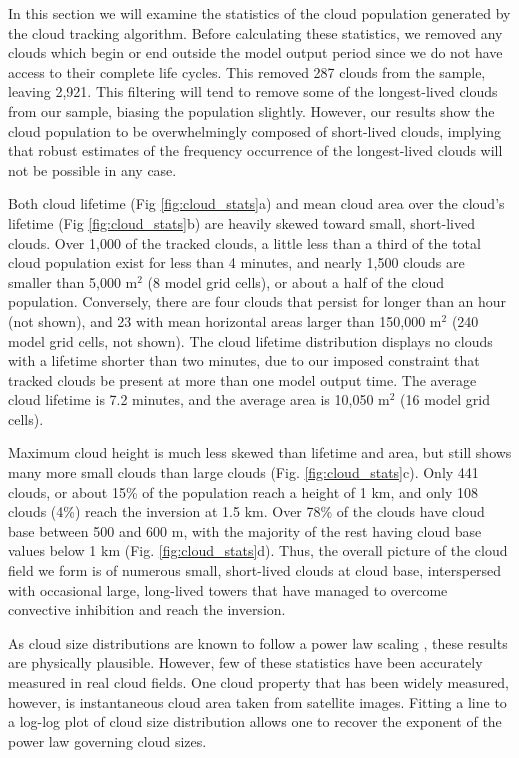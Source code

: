 \documentclass[acp]{copernicus}
\begin{document}
In this section we will examine the statistics of the cloud population 
generated by the cloud tracking algorithm.  Before calculating these 
statistics, we removed any clouds which begin or end outside the model output
period since we do not have access to their complete life cycles. This removed 
287 clouds from the sample, leaving 2,921.  This filtering will tend to remove 
some of the longest-lived clouds from our sample, biasing the population 
slightly.  However, our results show the cloud population to be overwhelmingly 
composed of short-lived clouds, implying that robust estimates of the frequency 
occurrence of the longest-lived clouds will not be possible in any case.

Both cloud lifetime (Fig \ref{fig:cloud_stats}a) and mean cloud area over the 
cloud's lifetime (Fig \ref{fig:cloud_stats}b) are heavily skewed toward small, 
short-lived clouds.  Over 1,000 of the tracked clouds, a little less than a 
third of the total cloud population exist for less than 4 minutes, and nearly 
1,500 clouds are smaller than 5,000 m$^2$ (8 model grid cells), or about a half 
of the cloud population.  Conversely, there are four clouds that persist for 
longer than an hour (not shown), and 23 with mean horizontal areas larger than 
150,000 m$^2$ (240 model grid cells, not shown).  The cloud lifetime 
distribution displays no clouds with a lifetime shorter than two minutes, due 
to our imposed constraint that tracked clouds be present at more than one model 
output time.  The average cloud lifetime is 7.2 minutes, and the average area 
is 10,050 m$^2$ (16 model grid cells).

Maximum cloud height is much less skewed than lifetime and area, but still 
shows many more small clouds than large clouds (Fig. \ref{fig:cloud_stats}c).
Only 441 clouds, or about 15\% of the population reach a height of 1 km, and 
only 108 clouds (4\%) reach the inversion at 1.5 km.  Over 78\% of the clouds 
have cloud base between 500 and 600 m, with the majority of the rest having 
cloud base values below 1 km (Fig. \ref{fig:cloud_stats}d).  Thus, the overall 
picture of the cloud field we form is of numerous small, short-lived clouds at 
cloud base, interspersed with occasional large, long-lived towers that have 
managed to overcome convective inhibition and reach the inversion.

As cloud size distributions are known to follow a power law scaling 
\cite{Zhao2007}, these results are physically plausible. However, few of these 
statistics have been accurately measured in real cloud fields. One cloud 
property that has been widely measured, however, is instantaneous cloud area 
taken from satellite images.  Fitting a line to a log-log plot of cloud size 
distribution allows one to recover the exponent of the power law governing 
cloud sizes. 
\end{document}
